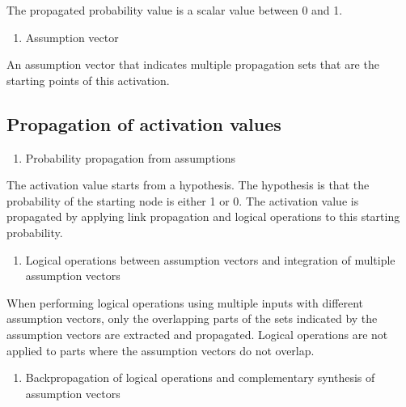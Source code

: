 \documentclass[12pt]{article}
\begin{document}
The propagated probability value is a scalar value between 0 and 1.

\begin{enumerate}
\def\labelenumi{\arabic{enumi}.}
\setcounter{enumi}{1}

\item
  Assumption vector
\end{enumerate}

An assumption vector that indicates multiple propagation sets that are
the starting points of this activation.

\subsection{Propagation of activation values}\label{propagation-of-activation-values}

\begin{enumerate}
\def\labelenumi{\arabic{enumi}.}

\item
  Probability propagation from assumptions
\end{enumerate}

The activation value starts from a hypothesis. The hypothesis is that
the probability of the starting node is either 1 or 0. The activation
value is propagated by applying link propagation and logical operations
to this starting probability.

\begin{enumerate}
\def\labelenumi{\arabic{enumi}.}
\setcounter{enumi}{1}

\item
  Logical operations between assumption vectors and integration of
  multiple assumption vectors
\end{enumerate}

When performing logical operations using multiple inputs with different
assumption vectors, only the overlapping parts of the sets indicated by
the assumption vectors are extracted and propagated. Logical operations
are not applied to parts where the assumption vectors do not overlap.

\begin{enumerate}
\def\labelenumi{\arabic{enumi}.}
\setcounter{enumi}{2}

\item
  Backpropagation of logical operations and complementary synthesis of
  assumption vectors
\end{enumerate}
\end{document}

